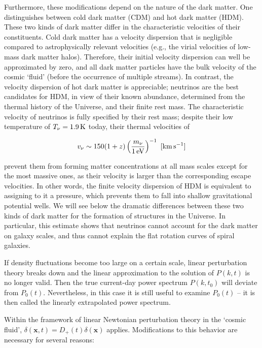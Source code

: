 \documentclass[a4paper,11pt]{article}
\begin{document}
{\noindent}Furthermore, these modifications depend on the nature of the dark matter. One distinguishes between cold dark matter (CDM) and hot dark matter (HDM). These two kinds of dark matter differ in the characteristic velocities of their constituents. Cold dark matter has a velocity dispersion that is negligible compared to astrophysically relevant velocities (e.g., the virial velocities of low-mass dark matter halos). Therefore, their initial velocity dispersion can well be approximated by zero, and all dark matter particles have the bulk velocity of the cosmic `fluid' (before the occurrence of multiple streams). In contrast, the velocity dispersion of hot dark matter is appreciable; neutrinos are the best candidates for HDM, in view of their known abundance, determined from the thermal history of the Universe, and their finite rest mass. The characteristic velocity of neutrinos is fully specified by their rest mass; despite their low temperature of $T_\nu=1.9\,{\rm K}$ today, their thermal velocities of

\begin{align*}
    v_\nu \sim 150(1+z)\left(\frac{m_\nu}{1\,{\rm eV}}\right)^{-1} ~ [{\rm km\,s^{-1}}]
\end{align*}

{\noindent}prevent them from forming matter concentrations at all mass scales except for the most massive ones, as their velocity is larger than the corresponding escape velocities. In other words, the finite velocity dispersion of HDM is equivalent to assigning to it a pressure, which prevents them to fall into shallow gravitational potential wells. We will see below the dramatic differences between these two kinds of dark matter for the formation of structures in the Universe. In particular, this estimate shows that neutrinos cannot account for the dark matter on galaxy scales, and thus cannot explain the flat rotation curves of spiral galaxies.

{\noindent}If density fluctuations become too large on a certain scale, linear perturbation theory breaks down and the linear approximation to the solution of $P(k,t)$ is no longer valid. Then the true current-day power spectrum $P(k,t_0)$ will deviate from $P_0(t)$. Nevertheless, in this case it is still useful to examine $P_0(t)$ -- it is then called the linearly extrapolated power spectrum.

{\noindent}Within the framework of linear Newtonian perturbation theory in the `cosmic fluid', $\delta(\mathbf{x},t) = D_+(t)\delta(\mathbf{x})$ applies. Modifications to this behavior are necessary for several reasons:
\end{document}
